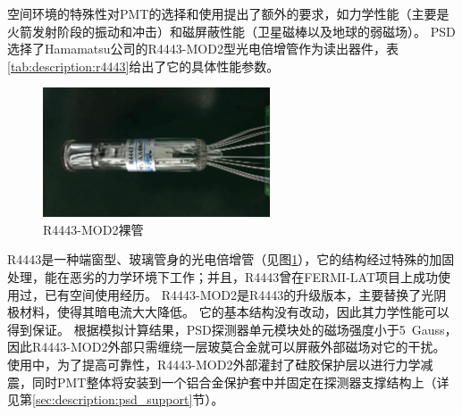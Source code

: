 空间环境的特殊性对PMT的选择和使用提出了额外的要求，如力学性能（主要是火箭发射阶段的振动和冲击）和磁屏蔽性能（卫星磁棒以及地球的弱磁场）。
PSD选择了Hamamatsu公司的R4443-MOD2型光电倍增管作为读出器件，表\ref{tab:description:r4443}给出了它的具体性能参数。
\begin{figure}[htb]
\centering
\includegraphics[width=0.6\textwidth]{chap/description/fig/r4443.jpg}
\caption{R4443-MOD2裸管}
\label{fig:description:r4443}
\end{figure}
R4443是一种端窗型、玻璃管身的光电倍增管（见图\ref{fig:description:r4443}），它的结构经过特殊的加固处理，能在恶劣的力学环境下工作；并且，R4443曾在FERMI-LAT项目上成功使用过，已有空间使用经历。
R4443-MOD2是R4443的升级版本，主要替换了光阴极材料，使得其暗电流大大降低。
它的基本结构没有改动，因此其力学性能可以得到保证。
根据模拟计算结果，PSD探测器单元模块处的磁场强度小于\SI{5}{Gauss}，因此R4443-MOD2外部只需缠绕一层玻莫合金就可以屏蔽外部磁场对它的干扰。
使用中，为了提高可靠性，R4443-MOD2外部灌封了硅胶保护层以进行力学减震，同时PMT整体将安装到一个铝合金保护套中并固定在探测器支撑结构上（详见第\ref{sec:description:psd_support}节）。
